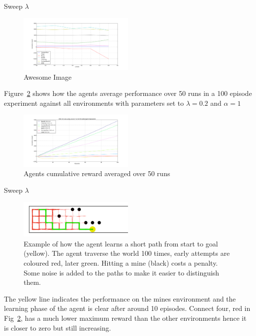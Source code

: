 Sweep $\lambda$
\begin{figure}[h]
    \centering
    \includegraphics[width=0.5\textwidth]{../data/lambdasweepplot.png}
    \caption{Awesome Image}
    \label{fig:awesome_image}
\end{figure}


Figure~\ref{fig:cumreward} shows how the agents average performance over 50 runs in a 100 episode experiment against all environments with parameters set to $\lambda = 0.2$ and $\alpha = 1$

\begin{figure}[h!]
    \centering
    \includegraphics[width=0.5\textwidth]{../data/100episodes_50runs.png}
    \caption{Agents cumulative reward averaged over 50 runs}
    \label{fig:cumreward}
\end{figure}

Sweep $\lambda$
\begin{figure}[h]
    \centering
    \includegraphics[width=0.5\textwidth]{../data/minPlot.png}
    \caption{Example of how the agent learns a short path from start to goal (yellow). The agent traverse the world 100 times, early attempts are coloured red, later green. Hitting a mine (black) costs a penalty. Some noise is added to the paths to make it easier to distinguish them.}
    \label{fig:awesome_image}
\end{figure}

The yellow line indicates the performance on the mines environment and the learning phase of the agent is clear after around 10 episodes. Connect four, red in Fig~\ref{fig:cumreward}, has a much lower maximum reward than the other environments hence it is closer to zero but still increasing.

